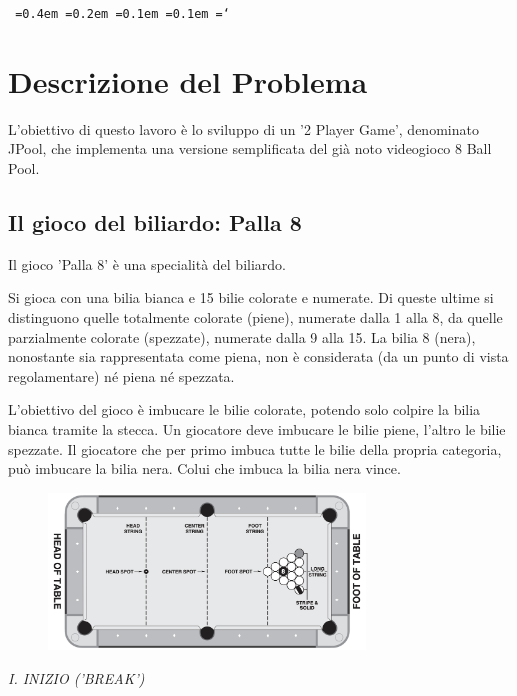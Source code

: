 \documentclass[12pt,a4paper]{report}
\newcommand*\justify{
  \fontdimen2\font=0.4em
  \fontdimen3\font=0.2em
  \fontdimen4\font=0.1em
  \fontdimen7\font=0.1em
  \hyphenchar\font=`\-
}
\begin{document}
\tableofcontents %

\texttt{\justify}

\chapter{Descrizione del Problema} \label{ch:Problem Description} %
L'obiettivo di questo lavoro è lo sviluppo di un '2 Player Game', denominato JPool, che implementa una versione semplificata del già noto videogioco 8 Ball Pool.

\section{Il gioco del biliardo: Palla 8} \label{se:8 Ball Pool} %
Il gioco 'Palla 8' è una specialità del biliardo. \cite{Rules}

\vspace{3mm}

Si gioca con una bilia bianca e 15 bilie colorate e numerate.
Di queste ultime si distinguono quelle totalmente colorate (piene), numerate dalla 1 alla 8, da quelle parzialmente colorate (spezzate), numerate dalla 9 alla 15.
La bilia 8 (nera), nonostante sia rappresentata come piena, non è considerata (da un punto di vista regolamentare) né piena né spezzata.

\vspace{3mm}

L'obiettivo del gioco è imbucare le bilie colorate, potendo solo colpire la bilia bianca tramite la stecca.
Un giocatore deve imbucare le bilie piene, l'altro le bilie spezzate.
Il giocatore che per primo imbuca tutte le bilie della propria categoria, può imbucare la bilia nera.
Colui che imbuca la bilia nera vince.

\begin{figure}
	\center
	\includegraphics[width=0.75\textwidth]{PoolSplit.png}
\end{figure}

\noindent \emph{I. INIZIO ('BREAK')}
\end{document}
